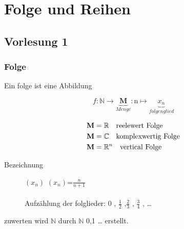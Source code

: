 \chapter{Folge und Reihen}
\section{Vorlesung 1}
\subsection{Folge}
\begin{definition}[Folgen]
    Ein folge ist eine Abbildung

    \[ f: \mathbb{N} \rightarrow \underbrace{\mathbf{M}}_{Menge} : \mathrm{n} \mapsto \underbrace{x_n}_{folgenglied} \]

\end{definition}
\begin{remark}

    \begin{align}	\mathbf{M} &= \mathbb{R} \quad \text{reelewert Folge} \notag \\
    \mathbf{M}&= \mathbb{C} \quad	\text{komplexwertig Folge}   \notag \\
    \mathbf{M}&= \mathbb{R}^n \quad \text{vertical Folge} \notag
    \end{align}




\end{remark}
\begin{description}

    \item[Bezeichnung]

    \quad $(x_n)$ \space {} \space $ \left( x_n   \right)$=$ \frac{n}{n+1} $
    \\ \\ Aufzählung der folglieder: 0 , $\frac{1}{2}$ ,$\frac{2}{3}$ , $\frac{3}{4}$ , \dots

\end{description}
\begin{remark}
    zuwerten wird $\mathbb{N}$ durch $\mathbb{N}$ {0,1 \dots} erstellt.


\end{remark}
